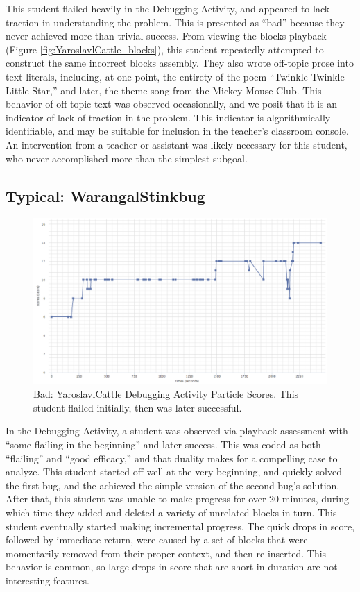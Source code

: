 This student flailed heavily in the Debugging Activity, and appeared to lack traction in understanding the problem. This is presented as ``bad'' because they never achieved more than trivial success. From viewing the blocks playback (Figure \ref{fig:YaroslavlCattle_blocks}), this student repeatedly attempted to construct the same incorrect blocks assembly. They also wrote off-topic prose into text literals, including, at one point, the entirety of the poem ``Twinkle Twinkle Little Star,'' and later, the theme song from the Mickey Mouse Club. This behavior of off-topic text was observed occasionally, and we posit that it is an indicator of lack of traction in the problem. This indicator is algorithmically identifiable, and may be suitable for inclusion in the teacher's classroom console. An intervention from a teacher or assistant was likely necessary for this student, who never accomplished more than the simplest subgoal. 


\subsection{Typical: WarangalStinkbug}
\begin{figure}
	\centering
	\includegraphics[width=\textwidth]{images/stories/scores-debug-WarangalStinkbug}
	\caption[Bad: YaroslavlCattle Debugging Activity Particle Scores]{Bad: YaroslavlCattle Debugging Activity Particle Scores. This student flailed initially, then was later successful.}
	\label{fig:WarangalStinkbug_chart}
\end{figure}
In the Debugging Activity, a student was observed via playback assessment with ``some flailing in the beginning'' and later success. This was coded as both ``flailing'' and ``good efficacy,'' and that duality makes for a compelling case to analyze. This student started off well at the very beginning, and quickly solved the first bug, and the achieved the simple version of the second bug's solution. After that, this student was unable to make progress for over 20 minutes, during which time they added and deleted a variety of unrelated blocks in turn. This student eventually started making incremental progress. The quick drops in score, followed by immediate return, were caused by a set of blocks that were momentarily removed from their proper context, and then re-inserted. This behavior is common, so large drops in score that are short in duration are not interesting features.


